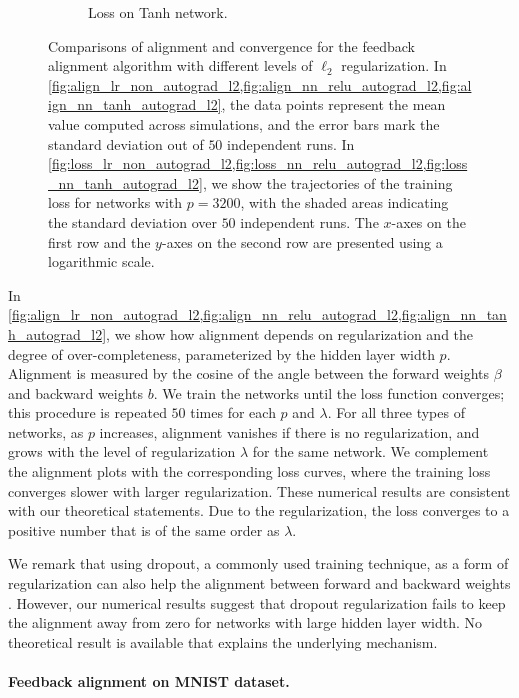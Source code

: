 \begin{figure}[ht]
\begin{subfigure}[b]{.33\textwidth}
  \caption{Loss on Tanh network.}
  \label{fig:loss_nn_tanh_autograd_l2}
\end{subfigure}
\caption{Comparisons of alignment and convergence for the feedback alignment algorithm with different levels of $\ell_2$ regularization. In \cref{fig:align_lr_non_autograd_l2,fig:align_nn_relu_autograd_l2,fig:align_nn_tanh_autograd_l2}, the data points represent the mean value computed across simulations, and the error bars mark the standard deviation out of $50$ independent runs. In \cref{fig:loss_lr_non_autograd_l2,fig:loss_nn_relu_autograd_l2,fig:loss_nn_tanh_autograd_l2}, we show the trajectories of the training loss for networks with $p = 3200$, with the shaded areas indicating the standard deviation over $50$ independent runs. The $x$-axes on the first row and the $y$-axes on the second row are presented using a logarithmic scale.}
\label{fig:synthetic-l2}
\end{figure}

In \cref{fig:align_lr_non_autograd_l2,fig:align_nn_relu_autograd_l2,fig:align_nn_tanh_autograd_l2}, we show how alignment depends on regularization and the degree of over-completeness, parameterized by the hidden layer width $p$. Alignment is measured by the cosine of the angle between the forward weights $\beta$ and backward weights $b$. We train the networks until the loss function converges; this procedure is repeated $50$ times for each $p$ and $\lambda$. For all three types of networks, as $p$ increases, alignment vanishes if there is no regularization, and grows with the level of regularization $\lambda$ for the same network. We complement the alignment plots with the corresponding loss curves, where the training loss converges slower with larger regularization. These numerical results are consistent with our theoretical statements. Due to the regularization, the loss converges to a positive number that is of the same order as $\lambda$.

We remark that using dropout, a commonly used training technique, as a form of regularization can also help the alignment between forward and backward weights \citep{wager2013dropout}. However, our numerical results suggest that dropout regularization fails to keep the alignment away from zero for networks with large hidden layer width. No theoretical result is available that explains the underlying mechanism.


\paragraph{Feedback alignment on MNIST dataset.}

